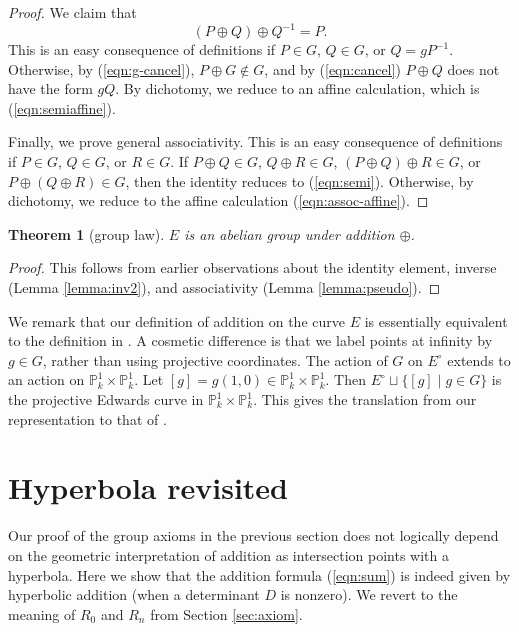 \documentclass[12pt]{article}
\newtheorem{theorem}{Theorem}[subsection]
\newcommand{\ring}[1]{\mathbb{#1}}
\newcommand{\Eoo}{E^{\circ}}
\newcommand{\hplus}{\oplus}
\begin{document}
\begin{proof}
We claim that
\begin{equation}\label{eqn:semi}
(P\oplus Q)\oplus Q^{-1} = P.
\end{equation}
This is an easy consequence of definitions if $P\in G$, $Q\in G$, or
$Q = gP^{-1}$.  Otherwise, by (\ref{eqn:g-cancel}), $P\oplus G\not\in
G$, and by (\ref{eqn:cancel}) $P\oplus Q$ does not have the form $g
Q$.  By dichotomy, we reduce to an affine calculation, which is
(\ref{eqn:semiaffine}).

Finally, we prove general associativity.  This is an easy consequence
of definitions if $P\in G$, $Q\in G$, or $R\in G$.  If $P\oplus Q\in
G$, $Q\oplus R\in G$, $(P\oplus Q)\oplus R\in G$, or $P\oplus (Q\oplus
R)\in G$, then the identity reduces to (\ref{eqn:semi}).  Otherwise,
by dichotomy, we reduce to the affine calculation
(\ref{eqn:assoc-affine}).
\end{proof}

\begin{theorem}[group law] $E$ is an abelian group under addition $\hplus$.
\end{theorem}

\begin{proof} This follows from earlier observations about the
  identity element, inverse (Lemma \ref{lemma:inv2}), and
  associativity (Lemma \ref{lemma:pseudo}).
\end{proof}

We remark that our definition of addition on the curve $E$ is
essentially equivalent to the definition in
\cite{bernstein2011complete}.  A cosmetic difference is that we label
points at infinity by $g\in G$, rather than using projective
coordinates.  The action of $G$ on $\Eoo$ extends to an action on
$\ring{P}^1_k\times \ring{P}^1_k$.  Let $[g] = g (1,0)\in
\ring{P}^1_k\times \ring{P}^1_k$.  Then $\Eoo\sqcup \{[g]\mid g\in
G\}$ is the projective Edwards curve in $\ring{P}^1_k\times \ring{P}^1_k$.
This gives the translation from our representation to that of
\cite{bernstein2011complete}.

\section{Hyperbola revisited}

Our proof of the group axioms in the previous section does not
logically depend on the geometric interpretation of addition as
intersection points with a hyperbola.  Here we show that the addition
formula (\ref{eqn:sum}) is indeed given by hyperbolic addition (when a
determinant $D$ is nonzero).  We revert to the meaning of $R_0$ and
$R_n$ from Section \ref{sec:axiom}.
\end{document}
